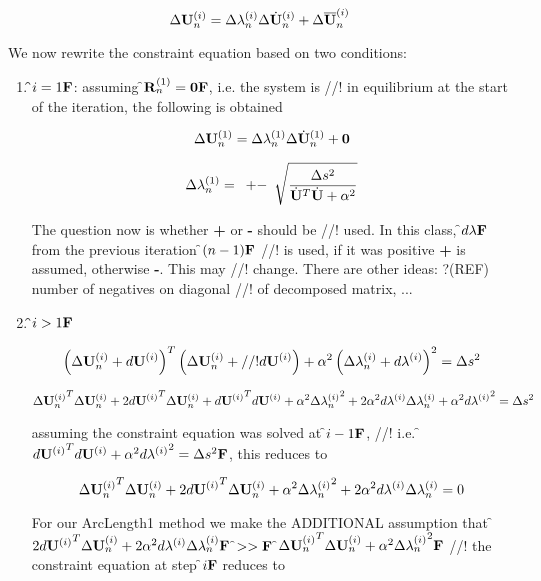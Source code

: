 \begin{equation}
 \Delta {\bf U}_n^{(i)} = \Delta \lambda_n^{(i)} \Delta \dot{\bf U}_n^{(i)} +
\Delta \overline{\bf U}_n^{(i)}  
\label{splitForm}
\end{equation}

\noindent We now rewrite the constraint equation based on two conditions:

\begin{enumerate}
\item {\bf \f$i = 1{\bf F}$}: assuming \f${\bf R}_n^{(1)} = {\bf 0}{\bf F}$, i.e. the system is
//! in equilibrium at the start of the iteration, the following is obtained

\[  \Delta {\bf U}_n^{(1)} = \Delta \lambda_n^{(1)} \Delta \dot{\bf U}_n^{(1)} + {\bf 0} \]

\[ \Delta \lambda_n^{(1)} = \begin{array}{c} + - \end{array}
\sqrt{\frac{\Delta s^2}{\dot{\bf U}^T \dot{\bf U} + \alpha^2}} \]

\noindent The question now is whether {\bf +} or {\bf -} should be
//! used. In this class, \f$d \lambda{\bf F}$ from the previous iteration \f$(n-1){\bf F}$
//! is used, if it was positive {\bf +} is assumed, otherwise {\bf -}. This may
//! change. There are other ideas: ?(REF) number of negatives on diagonal
//! of decomposed matrix, ...

\item {\bf \f$i > 1{\bf F}$}

\[ \left( \Delta {\bf U}_n^{(i)} + d{\bf U}^{(i)} \right)^T \left( \Delta {\bf U}_n^{(i)} +
//! d{\bf U}^{(i)} \right) + \alpha^2 \left( \Delta \lambda_n^{(i)} + d\lambda^{(i)}
\right)^2 = \Delta s^2 \]

\[
\Delta {{\bf U}_n^{(i)}}^T\Delta {\bf U}_n^{(i)} + 2{d{\bf U}^{(i)}}^T\Delta {\bf U}_n^{(i)} + {d{\bf U}^{(i)}}^T d{\bf U}^{(i)}
+ \alpha^2 \Delta {\lambda_n^{(i)}}^2
+ 2 \alpha^2 d\lambda^{(i)} \Delta \lambda_n^{(i)} + \alpha^2 {d\lambda^{(i)}}^2
= \Delta s^2
\]

\noindent assuming the constraint equation was solved at \f$i-1{\bf F}$,
//! i.e. \f${d{\bf U}^{(i)}}^T d{\bf U}^{(i)} + \alpha^2 {d\lambda^{(i)}}^2 = \Delta s^2{\bf F}$, this reduces to

\[
\Delta {{\bf U}_n^{(i)}}^T\Delta {\bf U}_n^{(i)} + 2{d{\bf U}^{(i)}}^T\Delta {\bf U}_n^{(i)} + 
\alpha^2 \Delta {\lambda_n^{(i)}}^2
+ 2 \alpha^2 d\lambda^{(i)} \Delta \lambda_n^{(i)} 
= 0
\]

 \noindent For our ArcLength1 method we make the ADDITIONAL assumption that
\f$ 2{d{\bf U}^{(i)}}^T\Delta {\bf U}_n^{(i)} 
+ 2 \alpha^2 d\lambda^{(i)} \Delta \lambda_n^{(i)} {\bf F}$ \f$>>{\bf F}$
\f$ 
\Delta {{\bf U}_n^{(i)}}^T\Delta {\bf U}_n^{(i)} +
\alpha^2 \Delta {\lambda_n^{(i)}}^2
{\bf F}$
//! the constraint equation at step \f$i{\bf F}$ reduces to


\end{enumerate}

